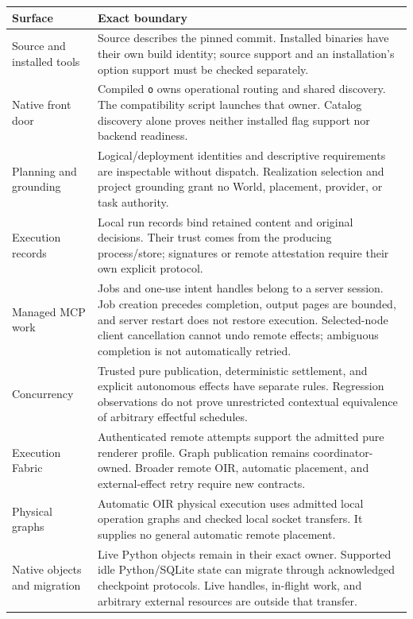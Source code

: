 \documentclass[11pt,oneside]{article}
\renewcommand{\arraystretch}{1.18}
\begin{document}
\begingroup
\small
\renewcommand{\arraystretch}{1.08}
\begin{longtable}{P{0.23\textwidth} P{0.69\textwidth}}
\toprule
\textbf{Surface} & \textbf{Exact boundary} \\
\midrule
\endhead
Source and installed tools & Source describes the pinned commit. Installed
binaries have their own build identity; source support and an installation's
option support must be checked separately. \\
Native front door & Compiled \texttt{o} owns operational routing and shared
discovery. The compatibility script launches that owner. Catalog discovery
alone proves neither installed flag support nor backend readiness. \\
Planning and grounding & Logical/deployment identities and descriptive
requirements are inspectable without dispatch. Realization selection and
project grounding grant no World, placement, provider, or task authority. \\
Execution records & Local run records bind retained content and original
decisions. Their trust comes from the producing process/store; signatures or
remote attestation require their own explicit protocol. \\
Managed MCP work & Jobs and one-use intent handles belong to a server session.
Job creation precedes completion, output pages are bounded, and server restart
does not restore execution. Selected-node client cancellation cannot undo
remote effects; ambiguous completion is not automatically retried. \\
Concurrency & Trusted pure publication, deterministic settlement, and explicit
autonomous effects have separate rules. Regression observations do not prove
unrestricted contextual equivalence of arbitrary effectful schedules. \\
Execution Fabric & Authenticated remote attempts support the admitted pure
renderer profile. Graph publication remains coordinator-owned. Broader remote
OIR, automatic placement, and external-effect retry require new contracts. \\
Physical graphs & Automatic OIR physical execution uses admitted local
operation graphs and checked local socket transfers. It supplies no general
automatic remote placement. \\
Native objects and migration & Live Python objects remain in their exact
owner. Supported idle Python/SQLite state can migrate through acknowledged
checkpoint protocols. Live handles, in-flight work, and arbitrary external
resources are outside that transfer. \\

\end{longtable}
\end{document}
